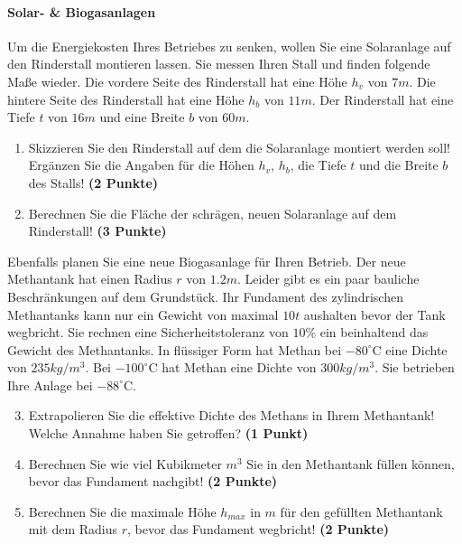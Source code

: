 \documentclass[a4paper, 9pt]{scrartcl}\usepackage[]{graphicx}\usepackage[]{xcolor}
\begin{document}
\paragraph{Solar- \& Biogasanlagen}



Um die Energiekosten Ihres Betriebes zu senken, wollen Sie eine Solaranlage
auf den Rinderstall montieren lassen. Sie messen Ihren Stall und finden
folgende Ma{\ss}e wieder. Die vordere Seite des Rinderstall hat eine H{\"o}he
$h_v$ von $7m$. Die hintere Seite des Rinderstall hat eine
H{\"o}he $h_b$ von $11m$. Der Rinderstall hat eine Tiefe $t$ von
$16m$ und eine Breite $b$ von $60m$.

\begin{enumerate}
\item Skizzieren Sie den Rinderstall auf dem die Solaranlage montiert
  werden soll! Erg{\"a}nzen Sie die Angaben f{\"u}r die H{\"o}hen $h_v$, $h_b$, die
  Tiefe $t$ und die Breite $b$ des Stalls!  \textbf{(2 Punkte)}
\item Berechnen Sie die Fl{\"a}che der schr{\"a}gen, neuen Solaranlage auf dem
  Rinderstall! \textbf{(3 Punkte)}
\end{enumerate}

Ebenfalls planen Sie eine neue Biogasanlage f{\"u}r Ihren Betrieb. Der neue
Methantank hat einen Radius $r$ von $1.2m$. Leider gibt es ein
paar bauliche Beschr{\"a}nkungen auf dem Grundst{\"u}ck. Ihr Fundament des
zylindrischen Methantanks kann nur ein Gewicht von maximal
$10t$ aushalten bevor der Tank wegbricht. Sie rechnen eine
Sicherheitstoleranz von $10\%$ ein beinhaltend das Gewicht des
Methantanks. In fl{\"u}ssiger Form hat
Methan bei $-80^\circ\text{C}$ eine Dichte von
$235kg/m^3$. Bei $-100^\circ\text{C}$ hat Methan eine Dichte
von $300kg/m^3$. Sie betrieben Ihre Anlage bei
$-88^\circ\text{C}$.

\begin{enumerate}
  \setcounter{enumi}{2}
\item Extrapolieren Sie die effektive Dichte des Methans in Ihrem
  Methantank! Welche Annahme haben Sie getroffen? \textbf{(1 Punkt)}
\item Berechnen Sie wie viel Kubikmeter $m^3$ Sie in den Methantank f{\"u}llen
  k{\"o}nnen, bevor das Fundament nachgibt! \textbf{(2 Punkte)}
\item Berechnen Sie die maximale H{\"o}he $h_{max}$ in $m$ f{\"u}r den gef{\"u}llten
  Methantank mit dem Radius $r$, bevor das Fundament wegbricht! \textbf{(2
    Punkte)}
\end{enumerate}
\end{document}
